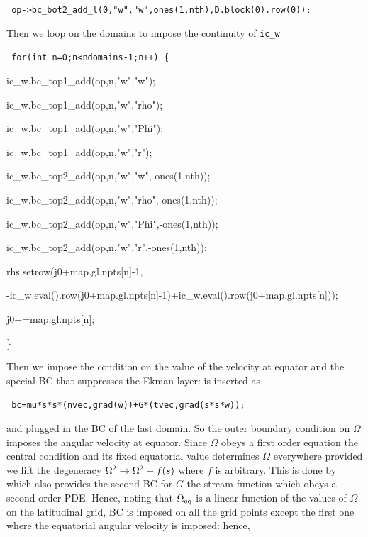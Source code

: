 \centerline{\tt
op->bc\_bot2\_add\_l(0,"w","w",ones(1,nth),D.block(0).row(0));}
\bigskip

Then we loop on the domains to impose the continuity of {\tt ic\_w}

\begin{center}
{\tt
        for(int n=0;n<ndomains-1;n++) \{  \par
                ic\_w.bc\_top1\_add(op,n,"w","w");  \par
                ic\_w.bc\_top1\_add(op,n,"w","rho");  \par
                ic\_w.bc\_top1\_add(op,n,"w","Phi");  \par
                ic\_w.bc\_top1\_add(op,n,"w","r");  \par
                ic\_w.bc\_top2\_add(op,n,"w","w",-ones(1,nth));  \par
                ic\_w.bc\_top2\_add(op,n,"w","rho",-ones(1,nth));  \par
                ic\_w.bc\_top2\_add(op,n,"w","Phi",-ones(1,nth));  \par
                ic\_w.bc\_top2\_add(op,n,"w","r",-ones(1,nth));  \par
                rhs.setrow(j0+map.gl.npts[n]-1,  \par
-ic\_w.eval().row(j0+map.gl.npts[n]-1)+ic\_w.eval().row(j0+map.gl.npts[n]));\par
  \par
                j0+=map.gl.npts[n];  \par
        \}  \par
}
\end{center}

\bigskip
Then we impose the condition on the value of the velocity at equator and
the special BC that suppresses the Ekman layer:
 is inserted as

\bigskip
\centerline{\tt
bc=mu*s*s*(nvec,grad(w))+G*(tvec,grad(s*s*w));
}

\bigskip
\noindent and plugged in the BC of the last domain. So the outer
boundary condition on $\Omega$ imposes the angular velocity at
equator. Since $\Omega$ obeys a first order equation the central
condition and its fixed equatorial value determines $\Omega$ everywhere
provided we lift the degeneracy $\Omega^2\rightarrow\Omega^2+f(s)$ where $f$ is
arbitrary. This is done by  which also provides the second BC
for $G$ the stream function which obeys a second order PDE. Hence,
noting that $\Omega_{\rm eq}$ is a linear function of the values of
$\Omega$ on the latitudinal grid, BC  is imposed on all the
grid points except the first one where the equatorial angular velocity
is imposed: hence,

